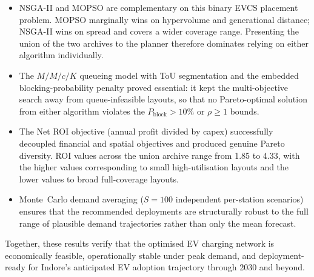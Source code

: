 \begin{itemize}
    \item NSGA-II and MOPSO are complementary on this binary EVCS
          placement problem. MOPSO marginally wins on hypervolume
          and generational distance; NSGA-II wins on spread and
          covers a wider coverage range. Presenting the union of
          the two archives to the planner therefore dominates
          relying on either algorithm individually.
    \item The $M/M/c/K$ queueing model with ToU segmentation and
          the embedded blocking-probability penalty proved
          essential: it kept the multi-objective search away from
          queue-infeasible layouts, so that no Pareto-optimal
          solution from either algorithm violates the
          $P_{\text{block}} > 10\%$ or $\rho \ge 1$ bounds.
    \item The Net ROI objective (annual profit divided by capex)
          successfully decoupled financial and spatial objectives
          and produced genuine Pareto diversity. ROI values across
          the union archive range from 1.85 to 4.33, with the
          higher values corresponding to small high-utilisation
          layouts and the lower values to broad full-coverage
          layouts.
    \item Monte~Carlo demand averaging ($S = 100$ independent
          per-station scenarios) ensures that the recommended
          deployments are structurally robust to the full range
          of plausible demand trajectories rather than only the
          mean forecast.
\end{itemize}

Together, these results verify that the optimised EV charging
network is economically feasible, operationally stable under peak
demand, and deployment-ready for Indore's anticipated EV adoption
trajectory through 2030 and beyond.
